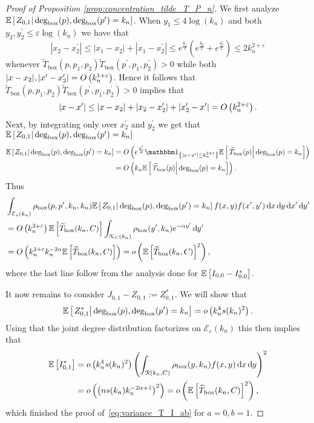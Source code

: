 \begin{proof}[Proof of Proposition \ref{prop:concentration_tilde_T_P_n}]
We first analyze $\mathbb{E}\left[\left.Z_{0,1}\right|\text{deg}_{\text{box}}(p), \text{deg}_{\text{box}}(p^\prime) = k_n\right]$. When $y_1 \le 4\log(k_n)$ and both $y_2, y_2^\prime \le \varepsilon \log(k_n)$ we have that
\[
	|x_2 - x_2^\prime| \le |x_1 - x_2| + |x_1 - x_2^\prime| \le e^{\frac{y_1}{2}}\left(e^{\frac{y_2}{2}} + e^{\frac{y_2^\prime}{2}}\right) \le 2k_n^{2+\varepsilon}
\]
whenever $\widetilde{T}_{\text{box}}(p,p_1,p_2) \widetilde{T}_{\text{box}}(p^\prime,p_1,p_2^\prime) > 0$ while both $|x - x_2|, |x^\prime - x_2^\prime| = O\left(k_n^{1 + \varepsilon}\right)$. Hence it follows that $\widetilde{T}_{\text{box}}(p,p_1,p_2) \widetilde{T}_{\text{box}}(p^\prime,p_1,p_2^\prime) > 0$ implies that
\[
	|x - x^\prime| \le |x - x_2| + |x_2 - x_2^\prime| + |x_2^\prime - x^\prime| = O\left(k_n^{2 + \varepsilon}\right).
\]
Next, by integrating only over $x_2^\prime$ and $y_2^\prime $ we get that $\mathbb{E}\left[\left.Z_{0,1}\right|\text{deg}_{\text{box}}(p), \text{deg}_{\text{box}}(p^\prime) = k_n\right]$ 
\begin{align*}
	\CExp{Z_{0,1}}{\Dbox(p), \Dbox(p^\prime) = k_n} &=
	\bigO{e^{\frac{y^\prime}{2}}\ind{|x-x^\prime|\le k_n^{2 + \varepsilon}} 
		\CExp{\widetilde{T}_{\text{box}}(p)}{\Dbox(p) =k_n}}\\
	&= \bigO{k_n \CExp{\widetilde{T}_{\text{box}}(p)}{\Dbox(p) =k_n}}.
\end{align*}
Thus
\begin{align*}
	&\int_{\mathcal{E}_\varepsilon(k_n)} \rho_{\text{box}}(p,p^\prime,k_n,k_n)
		\mathbb{E}\left[\left.Z_{0,1}\right|\text{deg}_{\text{box}}(p), \text{deg}_{\text{box}}(p^\prime) = k_n\right] f(x,y) f(x^\prime,y^\prime) \operatorname{\mathrm{d}\hspace{-2pt}} x \operatorname{\mathrm{d}\hspace{-2pt}} y \operatorname{\mathrm{d}\hspace{-2pt}} x^\prime \operatorname{\mathrm{d}\hspace{-2pt}} y^\prime\\
	&= O\left(k_n^{3+\varepsilon}\right) \mathbb{E}\left[\widetilde{T}_{\text{box}}(k_n,C)\right] 
		\int_{{\mathcal K}_{C}(k_n)}\rho_{\text{box}}(y^\prime,k_n) e^{-\alpha y^\prime} \operatorname{\mathrm{d}\hspace{-2pt}} y^\prime\\
	&= O\left(k_n^{2+\varepsilon} k_n^{-2\alpha} \mathbb{E}\left[\widetilde{T}_{\text{box}}(k_n,C)\right] \right) 
		= o\left(\mathbb{E}\left[\widetilde{T}_{\text{box}}(k_n,C)\right]^2\right), 
\end{align*}
where the last line follow from the analysis done for $\mathbb{E}\left[I_{0,0}-I_{0,0}^\ast\right]$.

It now remains to consider $J_{0,1} - Z_{0,1} := Z_{0,1}^\ast$. We will show that 
\begin{equation}\label{eq:expectation_J01}
	\mathbb{E}\left[\left.Z_{0,1}^\ast\right|\text{deg}_{\text{box}}(p), \text{deg}_{\text{box}}(p^\prime) = k_n\right] = o\left(k_n^4 s(k_n)^2\right).
\end{equation} 
Using that the joint degree distribution factorizes on $\mathcal{E}_\varepsilon(k_n)$ this then implies that
\begin{align*}
	\mathbb{E}\left[I_{0,1}^\ast\right]
	&= o\left(k_n^4 s(k_n)^2\right) \left(\int_{{\mathcal R}(k_n,C)} \rho_{\text{box}}(y,k_n) f(x,y) \operatorname{\mathrm{d}\hspace{-2pt}} x \operatorname{\mathrm{d}\hspace{-2pt}} y \right)^2\\ 
	&= o\left(\left(n s(k_n) k_n^{-2\alpha + 1}\right)^2\right) = o\left(\mathbb{E}\left[\widetilde{T}_{\text{box}}(k_n,C)\right]^2\right),
\end{align*}
which finished the proof of~\eqref{eq:variance_T_I_ab} for $a = 0, b = 1$.


\end{proof}
